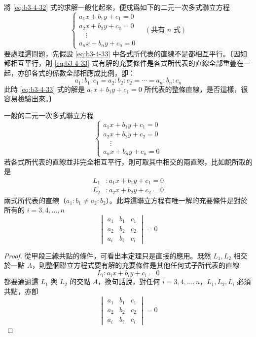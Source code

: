 將 \eqref{eq:b3-4-32} 式的求解一般化起來，便成爲如下的二元一次多式聯立方程
\begin{equation}
\begin{cases}
a_1 x + b_1 y + c_1 = 0 \\
a_2 x + b_2 y + c_2 = 0 \\
\quad \vdots \\
a_n x + b_n y + c_n = 0
\end{cases} \quad (\text{共有 } n \text{ 式})
\label{eq:b3-4-33}
\end{equation}
要處理這問題，先假設 \eqref{eq:b3-4-33} 中各式所代表的直線不是都相互平行。〔因如都相互平行，則 \eqref{eq:b3-4-33} 式有解的充要條件是各式所代表的直線全部重疊在一起，亦卽各式的係數全部相應成比例，卽：
\[
a_1 : b_1 : c_1 = a_2 : b_2 : c_2 = \cdots = a_n : b_n : c_n
\]
此時 \eqref{eq:b3-4-33} 式的解是 $a_1 x + b_1 y + c_1 = 0$ 所代表的整條直線，是否這樣，很容易檢驗出來。〕

\begin{theorem}
一般的二元一次多式聯立方程
\begin{equation}
\begin{cases}
a_1 x + b_1 y + c_1 = 0 \\
a_2 x + b_2 y + c_2 = 0 \\
\quad \vdots \\
a_n x + b_n y + c_n = 0
\end{cases}
\label{eq:b3-4-34}
\end{equation}
若各式所代表的直線並非完全相互平行，則可取其中相交的兩直線，比如說所取的是
\begin{align*}
L_1 &: a_1 x + b_1 y + c_1 = 0 \\
L_2 &: a_2 x + b_2 y + c_2 = 0
\end{align*}
兩式所代表的直線（$a_1 : b_1 \neq a_2 : b_2$）。此時這聯立方程有唯一解的充要條件是對於所有的 $i = 3, 4, \dots, n$
\begin{equation}
\begin{vmatrix}
a_1 & b_1 & c_1 \\
a_2 & b_2 & c_2 \\
a_i & b_i & c_i
\end{vmatrix} = 0
\label{eq:b3-4-35}
\end{equation}
\end{theorem}

\begin{proof}
從甲段三線共點的條件，可看出本定理只是直接的應用。既然 $L_1, L_2$ 相交於一點 $A$，則整個聯立方程式要有解的充要條件是其他任何式子所代表的直線
\[
L_i : a_i x + b_i y + c_i = 0
\]
都要通過這 $L_1$ 與 $L_2$ 的交點 $A$，換句話說，對任何 $i = 3, 4, \dots, n$，$L_1, L_2, L_i$ 必須共點，亦卽
\[
\begin{vmatrix}
a_1 & b_1 & c_1 \\
a_2 & b_2 & c_2 \\
a_i & b_i & c_i
\end{vmatrix} = 0
\]
\end{proof}

